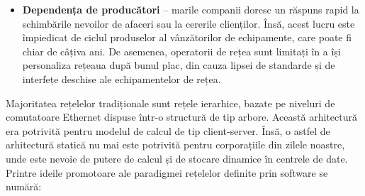 \begin{itemize}
	\item \textbf{Dependența de producători} – marile companii doresc un răspuns rapid la schimbările nevoilor de afaceri sau la cererile clienților. Însă, acest lucru este împiedicat de ciclul produselor al vânzătorilor de echipamente, care poate fi chiar de câțiva ani. De asemenea, operatorii de rețea sunt limitați în a își personaliza rețeaua după bunul plac, din cauza lipsei de standarde și de interfețe deschise ale echipamentelor de rețea.	
\end{itemize}

Majoritatea rețelelor tradiționale sunt rețele ierarhice, bazate pe niveluri de comutatoare Ethernet dispuse într-o structură de tip arbore. Această arhitectură era potrivită pentru modelul de calcul de tip client-server. Însă, o astfel de arhitectură statică nu mai este potrivită pentru corporațiile din zilele noastre, unde este nevoie de putere de calcul și de stocare dinamice în centrele de date. Printre ideile promotoare ale paradigmei rețelelor definite prin software se numără:
